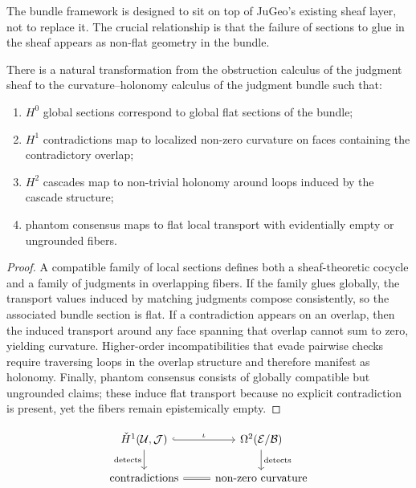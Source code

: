 \documentclass[11pt]{article}
\newcommand{\JB}{\mathcal{J}}
\newcommand{\Bundle}{\mathcal{E}}
\newcommand{\Base}{\mathcal{B}}
\newcommand{\HCech}{\check{H}}
\begin{document}
The bundle framework is designed to sit on top of JuGeo's existing sheaf layer,
not to replace it.  The crucial relationship is that the failure of sections to
glue in the sheaf appears as non-flat geometry in the bundle.

\begin{theorem}
There is a natural transformation from the obstruction calculus of the judgment
sheaf to the curvature--holonomy calculus of the judgment bundle such that:
\begin{enumerate}
  \item $H^0$ global sections correspond to global flat sections of the bundle;
  \item $H^1$ contradictions map to localized non-zero curvature on faces
    containing the contradictory overlap;
  \item $H^2$ cascades map to non-trivial holonomy around loops induced by the
    cascade structure;
  \item phantom consensus maps to flat local transport with evidentially empty
    or ungrounded fibers.
\end{enumerate}
\end{theorem}

\begin{proof}
A compatible family of local sections defines both a sheaf-theoretic cocycle and
a family of judgments in overlapping fibers.  If the family glues globally, the
transport values induced by matching judgments compose consistently, so the
associated bundle section is flat.  If a contradiction appears on an overlap,
then the induced transport around any face spanning that overlap cannot sum to
zero, yielding curvature.  Higher-order incompatibilities that evade pairwise
checks require traversing loops in the overlap structure and therefore manifest
as holonomy.  Finally, phantom consensus consists of globally compatible but
ungrounded claims; these induce flat transport because no explicit contradiction
is present, yet the fibers remain epistemically empty.
\end{proof}

\begin{equation}
\begin{tikzcd}
\HCech^1(\mathcal{U},\JB) \arrow[r, hook, "\iota"] \arrow[d, "\text{detects}"'] & \Omega^2(\Bundle/\Base) \arrow[d, "\text{detects}"] \\
\text{contradictions} \arrow[r, equal] & \text{non-zero curvature}
\end{tikzcd}
\end{equation}
\end{document}
